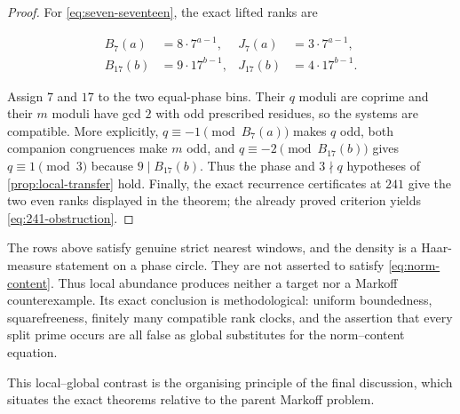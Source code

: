 \begin{proof}
For \cref{eq:seven-seventeen}, the exact lifted ranks are

\begin{equation}
\begin{aligned}
 B_7(a)&=8\mathbin{\cdot}7^{a-1},
 &J_7(a)&=3\mathbin{\cdot}7^{a-1},\\
 B_{17}(b)&=9\mathbin{\cdot}17^{b-1},
 &J_{17}(b)&=4\mathbin{\cdot}17^{b-1}.
\end{aligned}
\end{equation}

Assign $7$ and $17$ to the two equal-phase bins. Their $q$ moduli are
coprime and their $m$ moduli have gcd $2$ with odd prescribed residues, so
the systems are compatible. More explicitly,
$q\equiv-1\pmod {B_7(a)}$ makes $q$ odd, both companion congruences make
$m$ odd, and $q\equiv-2\pmod {B_{17}(b)}$ gives
$q\equiv1\pmod3$ because $9\mid B_{17}(b)$. Thus the phase and
$3\nmid q$ hypotheses of \cref{prop:local-transfer} hold. Finally, the
exact recurrence certificates at $241$ give the two even ranks displayed in
the theorem; the already proved criterion yields
\cref{eq:241-obstruction}.
\end{proof}

\begin{remark}
\label{rem:local-scope}
The rows above satisfy genuine strict nearest windows, and the density is a
Haar-measure statement on a phase circle. They are not asserted to satisfy
\cref{eq:norm-content}. Thus local abundance produces neither a target nor a
Markoff counterexample. Its exact conclusion is methodological: uniform
boundedness, squarefreeness, finitely many compatible rank clocks, and the
assertion that every split prime occurs are all false as global substitutes
for the norm--content equation.
\end{remark}

This local--global contrast is the organising principle of the final
discussion, which situates the exact theorems relative to the parent Markoff
problem.
